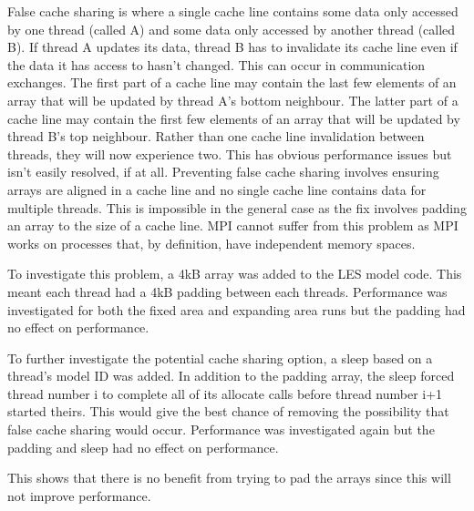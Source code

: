 False cache sharing is where a single cache line contains some data only
accessed by one thread (called A) and some data only accessed by another thread
(called B). If thread A updates its data, thread B has to invalidate its cache
line even if the data it has access to hasn't changed. This can occur in
communication exchanges. The first part of a cache line may contain the last few
elements of an array that will be updated by thread A's bottom neighbour. The
latter part of a cache line may contain the first few elements of an array that
will be updated by thread B's top neighbour. Rather than one cache line
invalidation between threads, they will now experience two. This has obvious
performance issues but isn't easily resolved, if at all. Preventing false cache
sharing involves ensuring arrays are aligned in a cache line and no single cache
line contains data for multiple threads. This is impossible in the general case
as the fix involves padding an array to the size of a cache line. MPI cannot
suffer from this problem as MPI works on processes that, by definition, have
independent memory spaces.

To investigate this problem, a 4kB array was added to the LES model code. This
meant each thread had a 4kB padding between each threads. Performance was
investigated for both the fixed area and expanding area runs but the padding had
no effect on performance.

To further investigate the potential cache sharing option, a sleep based on a
thread's model ID was added. In addition to the padding array, the sleep forced
thread number i to complete all of its allocate calls before thread number i+1
started theirs. This would give the best chance of removing the possibility that
false cache sharing would occur. Performance was investigated again but the
padding and sleep had no effect on performance.

This shows that there is no benefit from trying to pad the arrays since this
will not improve performance.
